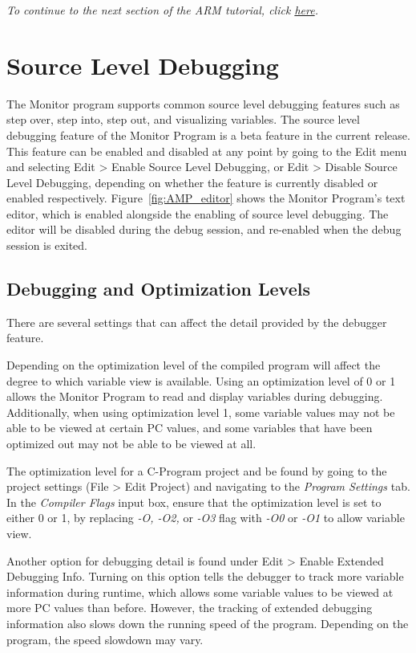 \documentclass[11pt, twoside, pdftex]{article}
\begin{document}
{\it To continue to the next section of the ARM tutorial, click \hyperref[tut:arm_7]{here}.}

\section{Source Level Debugging}
The Monitor program supports common source level debugging features such as step over, step into, 
step out, and visualizing variables. The source level debugging feature of the Monitor Program is
a beta feature in the current release. This feature can be enabled and disabled at any point by 
going to the {\sf Edit} menu and selecting {\sf Edit > Enable Source Level Debugging}, or 
{\sf Edit > Disable Source Level Debugging}, depending on whether the feature is currently disabled or enabled respectively.
Figure~\ref{fig:AMP_editor} shows the Monitor Program's text editor, which is enabled alongside 
the enabling of source level debugging. The editor will be disabled
during the debug session, and re-enabled when the debug session is exited. 

\subsection{Debugging and Optimization Levels} \label{sec:optimization_levels}
There are several settings that can affect the detail provided by the debugger feature.

Depending on the optimization level of the compiled program will affect the degree to which
variable view is available. Using an optimization level of 0 or 1 allows the Monitor Program to read and display 
variables during debugging. Additionally, when using optimization level 1, some variable values
may not be able to be viewed at certain PC values, and some variables that have been optimized out
may not be able to be viewed at all.

The optimization level for a C-Program project and be found by going to the project settings ({\sf File > Edit Project}) 
and navigating to the {\it Program Settings} tab. In the {\it Compiler Flags} input box, 
ensure that the optimization level is set to either 0 or 1, by replacing {\it -O, -O2, } 
or {\it -O3} flag with {\it -O0} or {\it -O1} to allow variable view. 

Another option for debugging detail is found under {\sf Edit > Enable Extended Debugging Info}.
Turning on this option tells the debugger to track more variable information during runtime,
which allows some variable values to be viewed at more PC values than before. However, the
tracking of extended debugging information also slows down the running speed of the program.
Depending on the program, the speed slowdown may vary.
\end{document}
